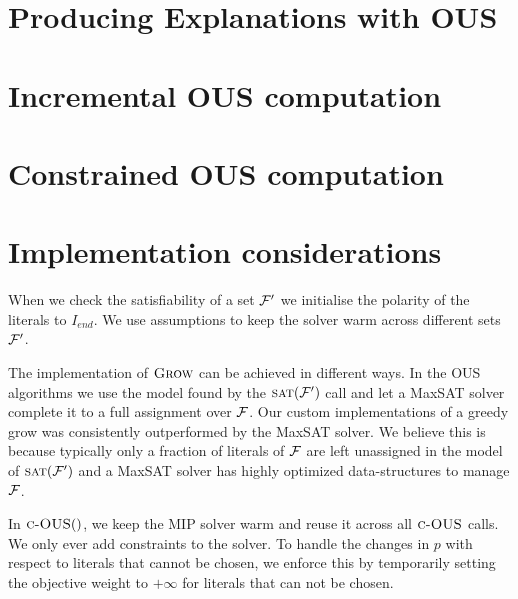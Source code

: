\documentclass[letterpaper]{article} %
\newcommand\m[1]{\ensuremath{\mathcal{#1}}}
\newcommand\comment[1]{\marginpar{\tiny #1}}
\renewcommand\comment[1]{#1}
\newcommand{\todo}[1]{{\comment{\color{red}\textsc{TODO:}#1} }}
\newcommand\formula{\ensuremath{\m{F} }\xspace}
\newcommand\mm[1]{\ensuremath{#1}\xspace}
\newcommand\call[1]{\mm{\textsc{#1}}}
\newcommand\sat{\mm{\call{sat}}}
\newcommand\grow{\mm{\call{Grow}}}
\newcommand\comus{\mm{\call{c-OUS}}}
\begin{document}
\section{Producing Explanations with OUS}\label{sec:Greedy}\label{sec:explain}



\section{Incremental OUS computation} \label{sec:incremental}


\section{Constrained OUS computation} \label{sec:constrained}


\section{Implementation considerations}\label{sec:impl}
When we check the satisfiability of a set $\F'$ we initialise the polarity of the literals to $I_{end}$. We use assumptions to keep the solver warm across different sets $\F'$.

The implementation of \grow can be achieved in different ways.
In the OUS algorithms we use the model found by the $\sat(\F')$ call and let a MaxSAT solver complete it to a full assignment over $\F$. Our custom implementations of a greedy grow was consistently outperformed by the MaxSAT solver. We believe this is because typically only a fraction of literals of $\F$ are left unassigned in the model of $\sat(\F')$ and a MaxSAT solver has highly optimized data-structures to manage $\F$.  %

In $\comus()$, we keep the MIP solver warm and reuse it across all $\comus$ calls. We only ever add constraints to the solver. To handle the changes in $p$ with respect to literals that cannot be chosen, we enforce this by temporarily setting the objective weight to $+\infty$ for literals that can not be chosen.

% 
\end{document}
